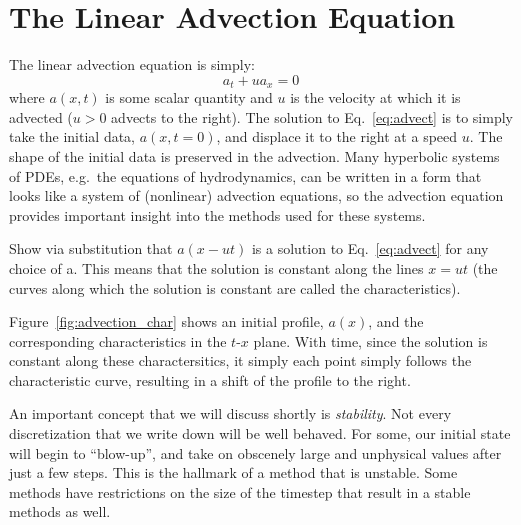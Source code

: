 \label{ch:advection}


\section{The Linear Advection Equation}

The linear advection equation is simply:
\begin{equation}
\label{eq:advect}
a_t + u a_x = 0
\end{equation}
where $a(x,t)$ is some scalar quantity and $u$ is the velocity at
which it is advected ($u > 0$ advects to the right).  The solution to
Eq.~\ref{eq:advect} is to simply take the initial data, $a(x,t=0)$,
and displace it to the right at a speed $u$.  The shape of the initial
data is preserved in the advection.  Many hyperbolic systems of PDEs,
e.g.\ the equations of hydrodynamics, can be written in a form that
looks like a system of (nonlinear) advection equations, so the
advection equation provides important insight into the methods used
for these systems.
%
\begin{exercise}
{Show via substitution that $a(x - ut)$ is a solution to
  Eq.~\ref{eq:advect} for any choice of a.  This means that
the solution is constant along the lines $x = u t$
(the curves along which the solution is constant are called the
characteristics).}
\end{exercise}

Figure~\ref{fig:advection_char} shows an initial profile, $a(x)$, and
the corresponding characteristics in the $t$-$x$ plane.  With time,
since the solution is constant along these charactersitics, it simply
each point simply follows the characteristic curve, resulting in a
shift of the profile to the right.

An important concept that we will discuss shortly is {\em stability}.
Not every discretization that we write down will be well behaved.  For
some, our initial state will begin to ``blow-up'', and take on
obscenely large and unphysical values after just a few steps.  This is
the hallmark of a method that is unstable.  Some methods have
restrictions on the size of the timestep that result in a stable
methods as well.

